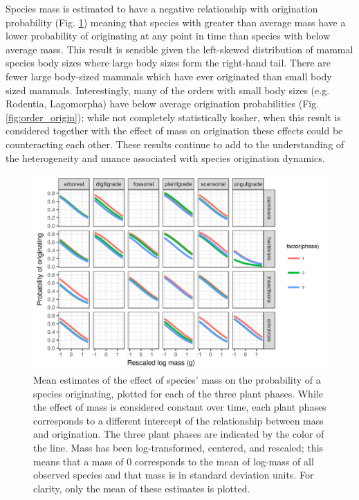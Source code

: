 \documentclass[12pt,letterpaper]{article}
\begin{document}
Species mass is estimated to have a negative relationship with origination probability (Fig. \ref{fig:mass_origin}) meaning that species with greater than average mass have a lower probability of originating at any point in time than species with below average mass. This result is sensible given the left-skewed distribution of mammal species body sizes where large body sizes form the right-hand tail. There are fewer large body-sized mammals which have ever originated than small body sized mammals. Interestingly, many of the orders with small body sizes (e.g. Rodentia, Lagomorpha) have below average origination probabilities (Fig. \ref{fig:order_origin}); while not completely statistically kosher, when this result is considered together with the effect of mass on origination these effects could be counteracting each other. These results continue to add to the understanding of the heterogeneity and nuance associated with species origination dynamics.
\begin{figure}[ht]
  \centering
  \includegraphics[width=\textwidth,height=0.4\textheight,keepaspectratio=true]{figure/mass_on_origin_bd}
  \caption{Mean estimates of the effect of species' mass on the probability of a species originating, plotted for each of the three plant phases. While the effect of mass is considered constant over time, each plant phases corresponds to a different intercept of the relationship between mass and origination. The three plant phases are indicated by the color of the line. Mass has been log-transformed, centered, and rescaled; this means that a mass of 0 corresponds to the mean of log-mass of all observed species and that mass is in standard deviation units. For clarity, only the mean of these estimates is plotted.}
  \label{fig:mass_origin}
\end{figure}
\end{document}
